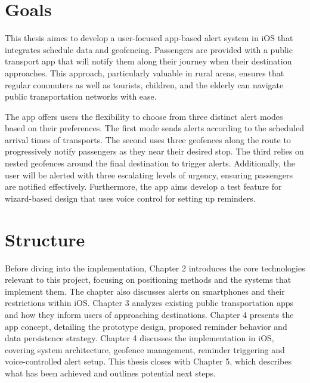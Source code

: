 \section{Goals}
This thesis aimes to develop a user-focused app-based alert system in iOS that integrates schedule data and geofencing. 
Passengers are provided with a public transport app that will notify them along their journey when their destination approaches.
This approach, particularly valuable in rural areas, ensures that regular commuters as well as tourists, children, and the elderly can navigate public transportation networks with ease.

The app offers users the flexibility to choose from three distinct alert modes based on their preferences. 
The first mode sends alerts according to the scheduled arrival times of transports. 
The second uses three geofences along the route to progressively notify passengers as they near their desired stop. 
The third relies on nested geofences around the final destination to trigger alerts. 
Additionally, the user will be alerted with three escalating levels of urgency, ensuring passengers are notified effectively.
Furthermore, the app aims develop a test feature for wizard-based design that uses voice control for setting up reminders.

\section{Structure}
Before diving into the implementation, Chapter 2 introduces the core technologies relevant to this project, focusing on positioning methods and the systems that implement them. 
The chapter also discusses alerts on smartphones and their restrictions within iOS. 
Chapter 3 analyzes existing public transportation apps and how they inform users of approaching destinations.
Chapter 4 presents the app concept, detailing the prototype design, proposed reminder behavior and data persistence strategy.
Chapter 4 discusses the implementation in iOS, covering system architecture, geofence management, reminder triggering and voice-controlled alert setup. 
This thesis closes with Chapter 5, which describes what has been achieved and outlines potential next steps.